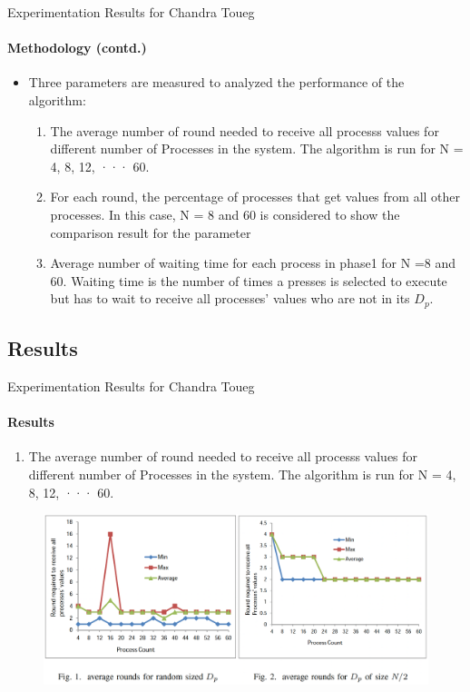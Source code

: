 \documentclass[11pt]{beamer}              %
\begin{document}
\begin{frame}{Experimentation Results for Chandra Toueg}
\framesubtitle{Methodology (contd.)}
\begin{itemize}
\item Three parameters are measured to analyzed the performance of the algorithm:
\begin{enumerate}
    \item The average number of round needed
to receive all processs values for different number of Processes in the system. The algorithm is run for N = 4, 8, 12,
··· 60.    
    \item For each round, the percentage of processes that get values from all other processes. In this case,
N = 8 and 60 is considered to show the comparison result for the parameter
    \item Average number of waiting time for
each process in phase1 for N =8 and 60. Waiting time is the number of times a presses is selected to execute but has to
wait to receive all processes’ values who are not in its \(D_p\).
\end{enumerate}
\end{itemize}
\end{frame}

\subsection{Results}
\begin{frame}{Experimentation Results for Chandra Toueg}
\framesubtitle{Results}
\begin{enumerate}
\item The average number of round needed
to receive all processs values for different number of Processes in the system. The algorithm is run for N = 4, 8, 12,
··· 60.
\end{enumerate}
\begin{figure}
    \centering
    \includegraphics[scale=0.3]{fig1.png}
    \label{fig:chandra_toueg_sudo}
\end{figure}
\end{frame}
\end{document}
